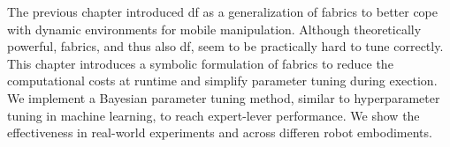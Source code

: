 The previous chapter introduced \acf{df} as a generalization of \acf{fabrics} to
better cope with dynamic environments for mobile manipulation. Although
theoretically powerful, \ac{fabrics}, and thus also \ac{df}, seem to be
practically hard to tune correctly. This chapter introduces a symbolic
formulation of \ac{fabrics} to reduce the computational costs at runtime and
simplify parameter tuning during exection. We implement a Bayesian parameter
tuning method, similar to hyperparameter tuning in machine learning, to reach
expert-lever performance. We show the effectiveness in real-world experiments
and across differen robot embodiments.
